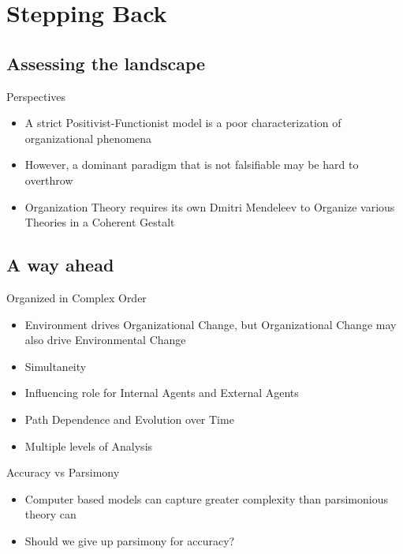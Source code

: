 \documentclass{beamer}
\begin{document}
\section{Stepping Back}
\subsection{Assessing the landscape}
\begin{frame}{Perspectives}{}
\begin{itemize}
\item<1->{A strict Positivist-Functionist model is a poor characterization of organizational phenomena}
\item<2->{However, a dominant paradigm that is not falsifiable may be hard to overthrow}
\item<3->{Organization Theory requires its own Dmitri Mendeleev to Organize various Theories in a Coherent Gestalt}
\end{itemize}
\end{frame}

\subsection{A way ahead}
\begin{frame}{Organized in Complex Order}{}
\begin{itemize}
\item<1->{Environment drives Organizational Change, but Organizational Change may also drive Environmental Change}
\item<2->{Simultaneity \citep{Smith2011}}
\item<3->{Influencing role for Internal Agents and External Agents}
\item<4->{Path Dependence and Evolution over Time}
\item<5->{Multiple levels of Analysis}
\end{itemize}
\end{frame}

\begin{frame}{Accuracy vs Parsimony}{}
\begin{itemize}
\item<1->{Computer based models can capture greater complexity than parsimonious theory can}
\item<2->{Should we give up parsimony for accuracy?}
\end{itemize}
\end{frame}



\end{document}
